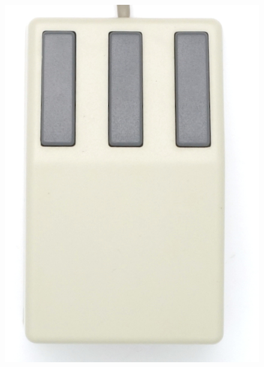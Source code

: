 \documentclass[11pt, a4paper]{article}
\begin{document}
\begin{figure}[h]
    \centering
    \includegraphics[scale=0.75]{1987_genius_gm5_mouse/top_30.jpg}

\end{figure}
\end{document}
